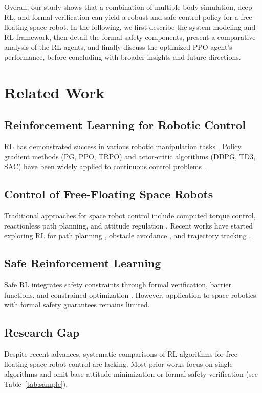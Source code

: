\documentclass{ieeeaccess}
\begin{document}
Overall, our study shows that a combination of multiple-body simulation, deep RL, and formal
verification can yield a robust and safe control policy for a free-floating space robot. In the
following, we first describe the system modeling and RL framework, then detail the formal safety
components, present a comparative analysis of the RL agents, and finally discuss the optimized PPO
agent’s performance, before concluding with broader insights and future directions.

\section{Related Work}
\subsection{Reinforcement Learning for Robotic Control}
RL has demonstrated success in various robotic manipulation tasks \cite{b2,b7}. 
Policy gradient methods (PG, PPO, TRPO) and actor-critic algorithms (DDPG, TD3, SAC) 
have been widely applied to continuous control problems \cite{b14,b15,b17,b18,b21}.

\subsection{Control of Free-Floating Space Robots}
Traditional approaches for space robot control include computed torque control, 
reactionless path planning, and attitude regulation \cite{b1,b6}. Recent works 
have started exploring RL for path planning \cite{wu2020reinforcement,al2024path}, 
obstacle avoidance \cite{huang2023obstacle}, and trajectory tracking \cite{hu2025deep}.

\subsection{Safe Reinforcement Learning}
Safe RL integrates safety constraints through formal verification, 
barrier functions, and constrained optimization \cite{b22,b23,b24,b34}. 
However, application to space robotics with formal safety guarantees remains limited.

\subsection{Research Gap}
Despite recent advances, systematic comparisons of RL algorithms for free-floating 
space robot control are lacking. Most prior works focus on single algorithms and 
omit base attitude minimization or formal safety verification (see Table~\ref{tab:sample}).
\end{document}
